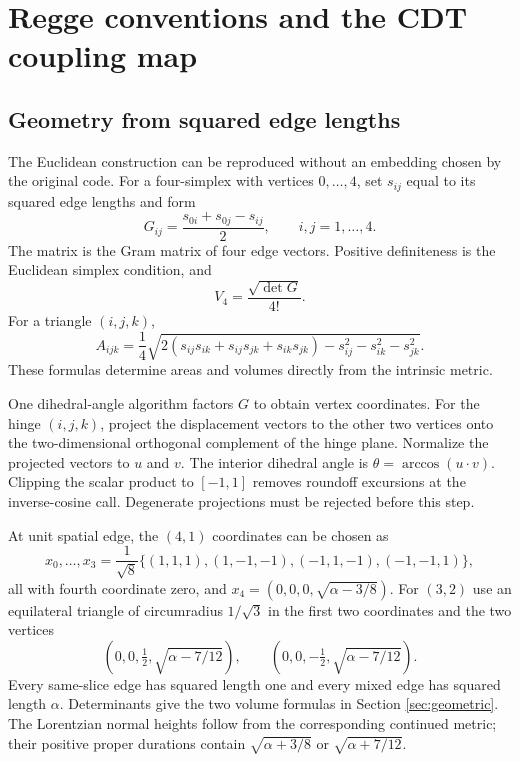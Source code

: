 \section{Regge conventions and the CDT coupling map}
\label{app:couplings}

\subsection{Geometry from squared edge lengths}

The Euclidean construction can be reproduced without an embedding chosen by the original code. For a four-simplex with vertices $0,\ldots,4$, set $s_{ij}$ equal to its squared edge lengths and form
\begin{equation}
G_{ij}=\frac{s_{0i}+s_{0j}-s_{ij}}2,\qquad i,j=1,\ldots,4.
\end{equation}
The matrix is the Gram matrix of four edge vectors. Positive definiteness is the Euclidean simplex condition, and
\begin{equation}
V_4=\frac{\sqrt{\det G}}{4!}.
\end{equation}
For a triangle $(i,j,k)$,
\begin{equation}
A_{ijk}=\frac14
\sqrt{2(s_{ij}s_{ik}+s_{ij}s_{jk}+s_{ik}s_{jk})
-s_{ij}^2-s_{ik}^2-s_{jk}^2}.
\end{equation}
These formulas determine areas and volumes directly from the intrinsic metric.

One dihedral-angle algorithm factors $G$ to obtain vertex coordinates. For the hinge $(i,j,k)$, project the displacement vectors to the other two vertices onto the two-dimensional orthogonal complement of the hinge plane. Normalize the projected vectors to $u$ and $v$. The interior dihedral angle is $\theta=\arccos(u\cdot v)$. Clipping the scalar product to $[-1,1]$ removes roundoff excursions at the inverse-cosine call. Degenerate projections must be rejected before this step.

At unit spatial edge, the $(4,1)$ coordinates can be chosen as
\begin{equation}
x_0,\ldots,x_3=\frac1{\sqrt8}
\{(1,1,1),(1,-1,-1),(-1,1,-1),(-1,-1,1)\},
\end{equation}
all with fourth coordinate zero, and
$x_4=(0,0,0,\sqrt{\alpha-3/8})$.
For $(3,2)$ use an equilateral triangle of circumradius $1/\sqrt3$ in the first two coordinates and the two vertices
\begin{equation}
(0,0,\tfrac12,\sqrt{\alpha-7/12}),\qquad
(0,0,-\tfrac12,\sqrt{\alpha-7/12}).
\end{equation}
Every same-slice edge has squared length one and every mixed edge has squared length $\alpha$. Determinants give the two volume formulas in Section \ref{sec:geometric}. The Lorentzian normal heights follow from the corresponding continued metric; their positive proper durations contain $\sqrt{\alpha+3/8}$ or $\sqrt{\alpha+7/12}$.

